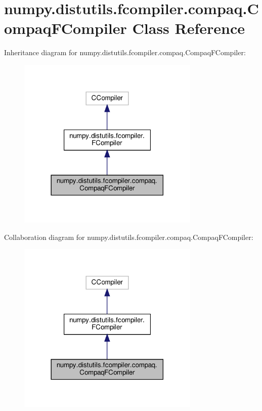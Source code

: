 \hypertarget{classnumpy_1_1distutils_1_1fcompiler_1_1compaq_1_1CompaqFCompiler}{}\section{numpy.\+distutils.\+fcompiler.\+compaq.\+Compaq\+F\+Compiler Class Reference}
\label{classnumpy_1_1distutils_1_1fcompiler_1_1compaq_1_1CompaqFCompiler}


Inheritance diagram for numpy.\+distutils.\+fcompiler.\+compaq.\+Compaq\+F\+Compiler\+:
\nopagebreak
\begin{figure}[H]
\begin{center}
\leavevmode
\includegraphics[width=246pt]{classnumpy_1_1distutils_1_1fcompiler_1_1compaq_1_1CompaqFCompiler__inherit__graph}
\end{center}
\end{figure}


Collaboration diagram for numpy.\+distutils.\+fcompiler.\+compaq.\+Compaq\+F\+Compiler\+:
\nopagebreak
\begin{figure}[H]
\begin{center}
\leavevmode
\includegraphics[width=246pt]{classnumpy_1_1distutils_1_1fcompiler_1_1compaq_1_1CompaqFCompiler__coll__graph}
\end{center}
\end{figure}
